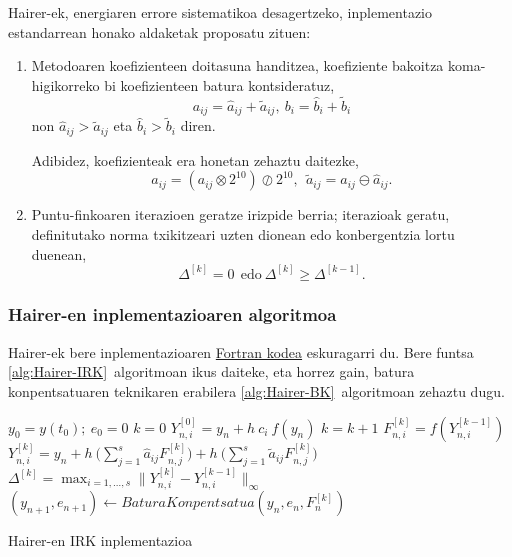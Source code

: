 Hairer-ek, energiaren errore sistematikoa desagertzeko, inplementazio estandarrean honako aldaketak proposatu zituen:
\begin{enumerate}
\item Metodoaren koefizienteen doitasuna handitzea, koefiziente bakoitza koma-higikorreko bi koefizienteen batura kontsideratuz,
\begin{equation}
\label{eq:hkoef}
a_{ij}= \hat a_{ij}+\tilde a_{ij}, \ b_i= \hat b_i+\tilde b_i
\end{equation} 
non $\hat a_{ij}>\tilde a_{ij}$ eta  $\hat b_i>\tilde b_i$ diren. 

Adibidez, koefizienteak era honetan zehaztu daitezke,
\begin{equation*}
\hat a_{ij}=(a_{ij} \otimes 2^{10}) \oslash 2^{10},\ \ \tilde a_{ij}= a_{ij}\ominus \hat a_{ij}.
\end{equation*}

\item Puntu-finkoaren iterazioen geratze irizpide berria; iterazioak geratu, definitutako norma txikitzeari uzten dionean edo konbergentzia lortu duenean,
\begin{equation}
\label{eq:hstop}
\Delta^{[k]} = 0 \ \ \text{edo} \  \Delta^{[k]} \geqslant \Delta^{[k-1]}.
\end{equation}
  	 	
\end{enumerate}

\subsubsection*{Hairer-en inplementazioaren algoritmoa}

Hairer-ek bere inplementazioaren \href{http://www.unige.ch/~hairer/preprints.html}{Fortran kodea}  eskuragarri du. Bere funtsa \ref{alg:Hairer-IRK}~algoritmoan ikus daiteke, eta horrez gain, batura konpentsatuaren teknikaren erabilera \ref{alg:Hairer-BK}~algoritmoan zehaztu dugu. 
 
\begin{algorithm}[h!]
 \BlankLine
  $y_0=y(t_0); \ e_0=0$\;
  {
   \BlankLine
   $k=0$\;
   $Y_{n,i}^{[0]}=y_n+h \ c_i \ f(y_n) $\; 
   \BlankLine
   {
    \BlankLine 
    $k=k+1$\;
    $F_{n,i}^{[k]}=f(Y_{n,i}^{[k-1]}) $\;
    $Y_{n,i}^{[k]}=y_n+ h \ \big(\sum\limits_{j=1}^{s} \hat a_{ij} F_{n,j}^{[k]} \big) 
                          + h \ \big(\sum\limits_{j=1}^{s} \tilde a_{ij} F_{n,j}^{[k]} \big)$\; 
    $\Delta ^{[k]} = \max_{i=1,\dots,s}\|Y_{n,i}^{[k]}-Y_{n,i}^{[k-1]}\|_{\infty}$\;
   }
   \BlankLine
   $(y_{n+1},e_{n+1})\leftarrow BaturaKonpentsatua(y_n,e_n,F_n^{[k]})$\;      
   \BlankLine
 }
 \caption{Hairer-en IRK inplementazioa}
 \label{alg:Hairer-IRK}
\end{algorithm}


